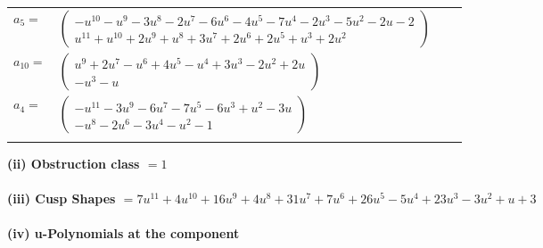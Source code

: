 \documentclass[1p]{elsarticle_modified}
\theoremstyle{definition}
\begin{document}
\begin{tabular}{m{7pt} m{180pt} m{7pt} m{180pt} }
\flushright $a_{5}=$&$\begin{pmatrix}- u^{10}- u^9-3 u^8-2 u^7-6 u^6-4 u^5-7 u^4-2 u^3-5 u^2-2 u-2\\u^{11}+u^{10}+2 u^9+u^8+3 u^7+2 u^6+2 u^5+u^3+2 u^2\end{pmatrix}$ \\
\flushright $a_{10}=$&$\begin{pmatrix}u^9+2 u^7- u^6+4 u^5- u^4+3 u^3-2 u^2+2 u\\- u^3- u\end{pmatrix}$ \\
\flushright $a_{4}=$&$\begin{pmatrix}- u^{11}-3 u^9-6 u^7-7 u^5-6 u^3+u^2-3 u\\- u^8-2 u^6-3 u^4- u^2-1\end{pmatrix}$\\&\end{tabular}
\flushleft \textbf{(ii) Obstruction class $= 1$}\\~\\
\flushleft \textbf{(iii) Cusp Shapes $= 7 u^{11}+4 u^{10}+16 u^9+4 u^8+31 u^7+7 u^6+26 u^5-5 u^4+23 u^3-3 u^2+u+3$}\\~\\
\newpage\renewcommand{\arraystretch}{1}
\flushleft \textbf{(iv) u-Polynomials at the component}\newline \\
\end{document}
